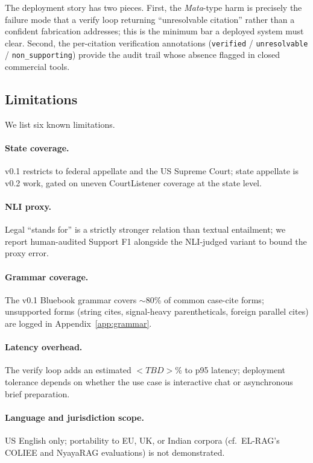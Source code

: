 \documentclass[11pt]{article}
\begin{document}
The deployment story has two pieces. First, the
\emph{Mata}-type harm \citep{mata2023} is precisely the failure mode
that a verify loop returning ``unresolvable citation'' rather than a
confident fabrication addresses; this is the minimum bar a deployed
system must clear. Second, the per-citation verification annotations
(\texttt{verified} / \texttt{unresolvable} / \texttt{non\_supporting})
provide the audit trail whose absence
\citet{magesh2025hallucination} flagged in closed commercial tools.

\subsection{Limitations}
\label{sec:discussion:limitations}

We list six known limitations.

\paragraph{State coverage.} v0.1 restricts to federal appellate and
the US Supreme Court; state appellate is v0.2 work, gated on uneven
CourtListener coverage at the state level.

\paragraph{NLI proxy.} Legal ``stands for'' is a strictly stronger
relation than textual entailment; we report human-audited Support F1
alongside the NLI-judged variant to bound the proxy error.

\paragraph{Grammar coverage.} The v0.1 Bluebook grammar covers
${\sim}80$\% of common case-cite forms; unsupported forms (string
cites, signal-heavy parentheticals, foreign parallel cites) are
logged in Appendix~\ref{app:grammar}.

\paragraph{Latency overhead.} The verify loop adds an estimated
$<TBD>$\% to p95 latency; deployment tolerance depends on whether
the use case is interactive chat or asynchronous brief preparation.

\paragraph{Language and jurisdiction scope.} US English only;
portability to EU, UK, or Indian corpora (cf.\ EL-RAG's COLIEE and
NyayaRAG evaluations) is not demonstrated.
\end{document}
